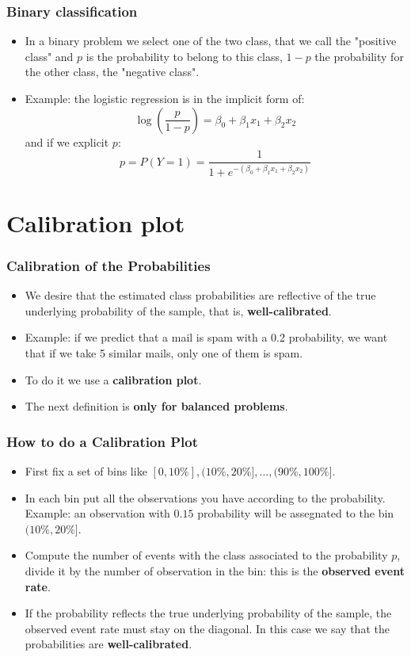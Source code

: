 \documentclass[9pt]{beamer}
\begin{document}
\begin{frame}
\frametitle{Binary classification}
\begin{itemize}
\item In a binary problem we select one of the two class, that we call the "positive class" and $p$ is the probability to belong to this class, $1-p$ the probability for the other class, the "negative class".
\item Example: the logistic regression is in the implicit form of:
$$
\log(\dfrac{p}{1-p}) = \beta_0 + \beta_1 x_1 + \beta_2 x_2
$$
and if we explicit $p$:
$$
p = P(Y = 1) = \dfrac{1}{1+ e^{-(\beta_0 + \beta_1 x_1 + \beta_2 x_2)}}
$$
\end{itemize}
\end{frame}


\section{Calibration plot}
\begin{frame}
\frametitle{Calibration of the Probabilities}
\begin{itemize}
\item We desire that the estimated class probabilities are reflective of the true underlying probability of the sample, that is, \textbf{well-calibrated}.
\item Example: if we predict that a mail is spam with a 0.2 probability, we want that if we take 5 similar mails, only one of them is spam.
\item To do it we use a \textbf{calibration plot}.
\item The next definition is \textbf{only for balanced problems}.
\end{itemize}
\end{frame}

\begin{frame}
\frametitle{How to do a Calibration Plot}
\begin{itemize}
\item First fix a set of bins like $[0, 10\%], (10\%, 20\%], ..., (90\%, 100\%]$.
\item In each bin put all the observations you have according to the probability. Example: an observation with $0.15$ probability will be assegnated to the bin $(10\%, 20\%]$.
\item Compute the number of events with the class associated to the probability $p$, divide it by the number of observation in the bin: this is the \textbf{observed event rate}.
\item If the probability reflects the true underlying probability of the sample, the observed event rate must stay on the diagonal. In this case we say that the probabilities are \textbf{well-calibrated}.
\end{itemize}
\end{frame}
\end{document}
